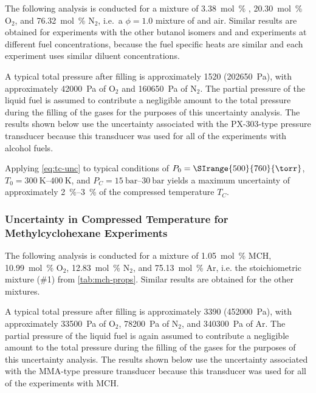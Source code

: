 \documentclass[../main.tex]{subfiles}
\begin{document}
The following analysis is conducted for a mixture of
\SI{3.38}{\mole\percent} \tBuOH{}, \SI{20.30}{\mole\percent} O$_2$, and
\SI{76.32}{\mole\percent} N$_2$, i.e.\ a $\phi=1.0$ mixture of \tBuOH{}
and air. Similar results are obtained for experiments with the other butanol
isomers and \iPeOH{} and experiments at different fuel concentrations,
because the fuel specific heats are similar and each experiment uses
similar diluent concentrations.

A typical total pressure after filling is approximately
\SI{1520}{\torr} (\SI{202650}{\pascal}), with approximately
\SI{42000}{\pascal} of O$_2$ and \SI{160650}{\pascal} of N$_2$. The partial
pressure of the liquid fuel is assumed to contribute a negligible amount
to the total pressure during the filling of the gases for the purposes of
this uncertainty analysis. The results shown below use the
uncertainty associated with the PX-303-type pressure transducer because
this transducer was used for all of the experiments with alcohol fuels.

Applying \cref{eq:tc-unc} to typical conditions of $P_0 = \SIrange{500}{760}{\torr}$,
$T_0=\SIrange{300}{400}{\kelvin}$, and $P_C=\SIrange{15}{30}{\bar}$ yields
a maximum uncertainty of approximately \SIrange{2}{3}{\percent} of the
compressed temperature $T_C$.

\subsubsection{Uncertainty in Compressed Temperature for Methylcyclohexane Experiments}
\label{sec:unc-mch}

The following analysis is conducted for a mixture of
\SI{1.05}{\mole\percent} MCH, \SI{10.99}{\mole\percent} O$_2$,
\SI{12.83}{\mole\percent} N$_2$, and \SI{75.13}{\mole\percent} Ar, i.e.
the stoichiometric mixture (\#1) from \cref{tab:mch-props}. Similar
results are obtained for the other mixtures.

A typical total pressure after filling is approximately
\SI{3390}{\torr} (\SI{452000}{\pascal}), with approximately
\SI{33500}{\pascal} of O$_2$, \SI{78200}{\pascal} of N$_2$, and
\SI{340300}{\pascal} of Ar. The partial pressure of the liquid fuel is
again assumed to contribute a negligible amount to the total pressure
during the filling of the gases for the purposes of this uncertainty
analysis. The results shown below use the uncertainty associated with
the MMA-type pressure transducer because this transducer was used for
all of the experiments with MCH.
\end{document}
